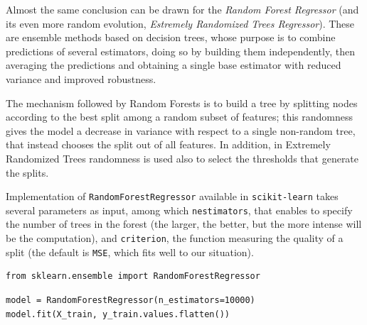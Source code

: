 

\bigbreak

Almost the same conclusion can be drawn for the \textit{Random Forest Regressor} (and its even more random evolution, \textit{Estremely Randomized Trees Regressor}). These are ensemble methods based on decision trees, whose purpose is to combine predictions of several estimators, doing so by building them independently, then averaging the predictions and obtaining a single base estimator with reduced variance and improved robustness.

The mechanism followed by Random Forests is to build a tree by splitting nodes according to the best split among a random subset of features; this randomness gives the model a decrease in variance with respect to a single non-random tree, that instead chooses the split out of all features. In addition, in Extremely Randomized Trees randomness is used also to select the thresholds that generate the splits.

Implementation of \texttt{RandomForestRegressor} available in \texttt{scikit-learn} takes several parameters as input, among which \texttt{n\textunderscore estimators}, that enables to specify the number of trees in the forest (the larger, the better, but the more intense will be the computation), and \texttt{criterion}, the function measuring the quality of a split (the default is \texttt{MSE}, which fits well to our situation).

\begin{lstlisting}[firstnumber=14]
from sklearn.ensemble import RandomForestRegressor
\end{lstlisting}

\begin{lstlisting}[firstnumber=115]
model = RandomForestRegressor(n_estimators=10000)
model.fit(X_train, y_train.values.flatten())
\end{lstlisting}

